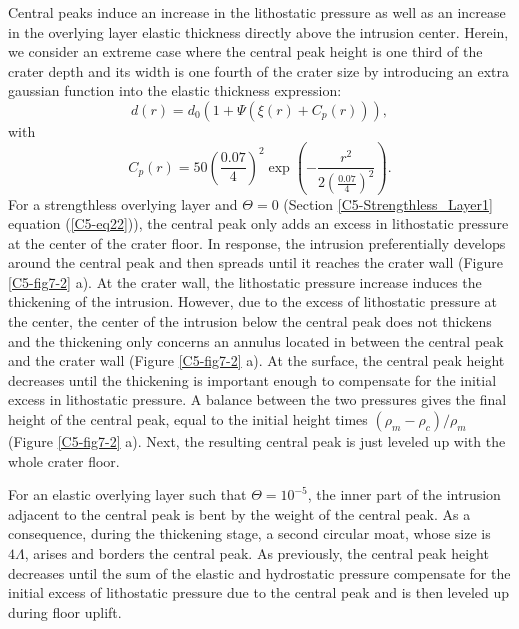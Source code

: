 Central peaks induce  an increase in the lithostatic  pressure as well
as an increase in the overlying layer elastic thickness directly above
the intrusion  center. Herein, we  consider an extreme case  where the
central peak height is one third of  the crater depth and its width is
one  fourth  of the  crater  size  by  introducing an  extra  gaussian
function into the elastic thickness expression:
\begin{equation}
  d(r)=d_0(1+\Psi(\xi(r)+C_p(r))),
\end{equation}
with
\begin{equation}
  C_p(r)=50 \left(\frac{0.07}{4}\right)^2\exp\left(-\frac{r^2}{2(\frac{0.07}{4})^2}\right).
\end{equation}
For   a  strengthless   overlying   layer   and  $\Theta=0$   (Section
\ref{C5-Strengthless_Layer1}  equation  (\ref{C5-eq22})), the  central
peak only adds an excess in  lithostatic pressure at the center of the
crater  floor.  In  response, the  intrusion  preferentially  develops
around the central  peak and then spreads until it  reaches the crater
wall (Figure \ref{C5-fig7-2}  a). At the crater  wall, the lithostatic
pressure increase  induces the  thickening of the  intrusion. However,
due to the excess of lithostatic pressure at the center, the center of
the  intrusion  below the  central  peak  does  not thickens  and  the
thickening only  concerns an  annulus located  in between  the central
peak and the  crater wall (Figure \ref{C5-fig7-2} a).  At the surface,
the central  peak height decreases  until the thickening  is important
enough to compensate for the initial excess in lithostatic pressure. A
balance  between the  two  pressures  gives the  final  height of  the
central    peak,     equal    to    the    initial     height    times
$(\rho_m-\rho_c)/\rho_m$   (Figure  \ref{C5-fig7-2}   a).  Next,   the
resulting central peak is just leveled up with the whole crater floor.

For an elastic  overlying layer such that  $\Theta=10^{-5}$, the inner
part of  the intrusion  adjacent to  the central peak  is bent  by the
weight of  the central peak.  As a consequence, during  the thickening
stage, a  second circular moat,  whose size is $4\Lambda$,  arises and
borders  the central  peak.  As previously,  the  central peak  height
decreases  until  the sum  of  the  elastic and  hydrostatic  pressure
compensate for the  initial excess of lithostatic pressure  due to the
central peak and is then leveled up during floor uplift.

